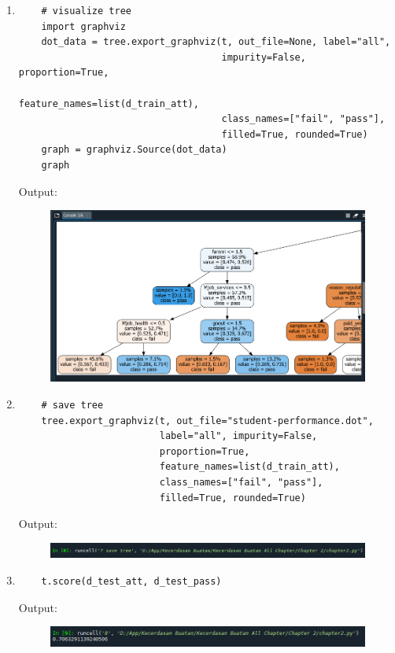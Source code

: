 \begin{enumerate}
\item
\begin{verbatim}
	# visualize tree
	import graphviz
	dot_data = tree.export_graphviz(t, out_file=None, label="all", 
									impurity=False, proportion=True,
	                                feature_names=list(d_train_att), 
									class_names=["fail", "pass"], 
	                                filled=True, rounded=True)
	graph = graphviz.Source(dot_data)
	graph
\end{verbatim}
\newline Output: 
\begin{figure}[!htbp]
	\centering
	\includegraphics[scale=0.5]{figures/chapter2/6.PNG}
\end{figure}

\item
\begin{verbatim}
	# save tree
	tree.export_graphviz(t, out_file="student-performance.dot", 
						 label="all", impurity=False, 
						 proportion=True,
	                     feature_names=list(d_train_att), 
	                     class_names=["fail", "pass"], 
	                     filled=True, rounded=True)
\end{verbatim}
\newline Output: 
\begin{figure}[!htbp]
	\centering
	\includegraphics[scale=0.5]{figures/chapter2/7.PNG}
\end{figure}

\item
\begin{verbatim}
	t.score(d_test_att, d_test_pass)
\end{verbatim}
\newline Output: 
\begin{figure}[!htbp]
	\centering
	\includegraphics[scale=0.5]{figures/chapter2/8.PNG}
\end{figure}


\end{enumerate}
